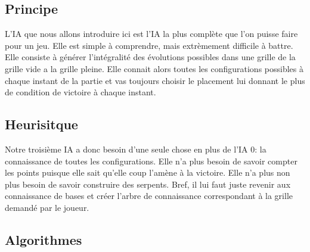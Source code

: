 \documentclass[a4paper,12pt]{report}
\begin{document}
\subsection{Principe}

L'IA que nous allons introduire ici est l'IA la plus compl\`ete que l'on puisse faire pour un jeu. Elle est simple \`a comprendre, mais extr\`emement difficile \`a battre. Elle consiste \`a g\'en\'erer l'int\'egralit\'e des \'evolutions possibles dans une grille de la grille vide a la grille pleine. Elle connait alors toutes les configurations possibles \`a chaque instant de la partie et vas toujours choisir le placement lui donnant le plus de condition de victoire \`a chaque instant.

\subsection{Heurisitque}

Notre troisi\`eme IA a donc besoin d'une seule chose en plus de l'IA 0: la connaissance de toutes les configurations. Elle n'a plus besoin de savoir compter les points puisque elle sait qu'elle coup l'am\`ene \`a la victoire. Elle n'a plus non plus besoin de savoir construire des serpents. Bref, il lui faut juste revenir aux connaissance de bases et cr\'eer l'arbre de connaissance correspondant \`a la grille demand\'e par le joueur.

\subsection{Algorithmes}
\end{document}
